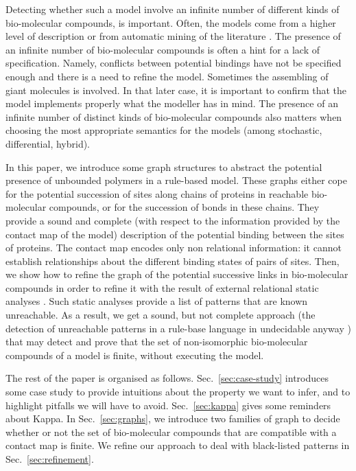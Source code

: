 \documentclass{entcs}
\begin{document}
Detecting whether such a model involve an infinite number of different kinds of bio-molecular compounds, is important. Often, the models come from a higher level of description \cite{DBLP:conf/cmsb/HarmerCLO17} or from automatic mining of the literature \cite{Gyori119834}. The presence of an infinite number of bio-molecular compounds is often a hint for a lack of specification. Namely, conflicts between potential bindings have not be specified enough and there is a need to refine the model. Sometimes the assembling of giant molecules is involved. In that later case, it is important to confirm that the model implements properly what the modeller has in mind.
The presence of an infinite number of distinct kinds of bio-molecular compounds also matters when choosing the most appropriate semantics for the models  (among stochastic, differential, hybrid).

In this paper, we introduce some graph structures to abstract the potential presence of unbounded polymers in a rule-based model. These graphs either cope for the potential succession of sites along chains of proteins in reachable bio-molecular compounds, or for the succession of bonds in these chains. They provide a sound and complete (with respect to the information provided by the contact map of the model) description of the potential binding between the sites of proteins.
The contact map encodes only non relational information: it cannot establish relationships about the different binding states of pairs of sites. Then, we show how to refine the graph of the potential successive links in bio-molecular compounds in order to refine it with the result of external relational static analyses \cite{DanosEtAl-VMCAI08,SASB2016,KaSa}. Such static analyses provide a list of patterns that are known unreachable. As a result, we get a sound, but not complete approach (the detection of unreachable patterns in a rule-base language in undecidable anyway \cite{kreyBig}) that may detect and prove that the set of non-isomorphic bio-molecular compounds of a model is finite, without executing the model.

The rest of the paper is organised as follows.
Sec.~\ref{sec:case-study} introduces some case study to provide intuitions about the property we want to infer, and to highlight pitfalls we will have to avoid. Sec.~\ref{sec:kappa} gives some reminders about Kappa.
In Sec.~\ref{sec:graphs}, we introduce two families of graph to decide whether or not the set of bio-molecular compounds that are compatible with a contact map is finite. We refine our approach to deal with black-listed patterns in Sec.~\ref{sec:refinement}.
\end{document}
